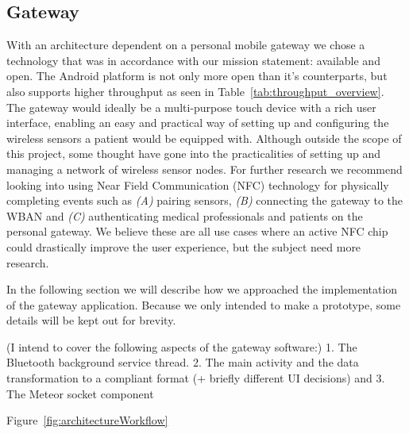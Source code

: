 

\subsection{Gateway} %
\label{sub:gateway}


With an architecture dependent on a personal mobile gateway we chose a technology that was in accordance with our mission statement: available and open. The Android platform is not only more open than it's counterparts, but also supports higher throughput as seen in Table~\ref{tab:throughput_overview}.
The gateway would ideally be a multi-purpose touch device with a rich user interface, enabling an easy and practical way of setting up and configuring the wireless sensors a patient would be equipped with. Although outside the scope of this project, some thought have gone into the practicalities of setting up and managing a network of wireless sensor nodes. For further research we recommend looking into using Near Field Communication (NFC) technology for physically completing events such as \emph{(A)} pairing sensors, \emph{(B)} connecting the gateway to the WBAN and \emph{(C)} authenticating medical professionals and patients on the personal gateway. We believe these are all use cases where an active NFC chip could drastically improve the user experience, but the subject need more research.

In the following section we will describe how we approached the implementation of the gateway application. Because we only intended to make a prototype, some details will be kept out for brevity. 

(I intend to cover the following aspects of the gateway software:)
1. The Bluetooth background service thread. 2. The main activity and the data transformation to a compliant format (+ briefly different UI decisions) and 3. The Meteor socket component

Figure~\ref{fig:architectureWorkflow} %



